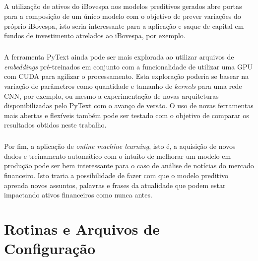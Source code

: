 \documentclass[grad,numbers]{coppe}
\begin{document}
 			\paragraph{}A utilização de ativos do iBovespa nos modelos preditivos gerados abre portas para a composição de um único modelo com o objetivo de prever variações do próprio iBovespa, isto seria interessante para a aplicação e saque de capital em fundos de investimento atrelados ao iBovespa, por exemplo.
 			\paragraph{}A ferramenta PyText ainda pode ser mais explorada ao utilizar arquivos de \textit{embeddings} pré-treinados em conjunto com a funcionalidade de utilizar uma GPU com CUDA para agilizar o processamento. Esta exploração poderia se basear na variação de parâmetros como quantidade e tamanho de \textit{kernels} para uma rede CNN, por exemplo, ou mesmo a experimentação de novas arquiteturas disponibilizadas pelo PyText com o avanço de versão. O uso de novas ferramentas mais abertas e flexíveis também pode ser testado com o objetivo de comparar os resultados obtidos neste trabalho.
 			\paragraph{}Por fim, a aplicação de \textit{online machine learning}, isto é, a aquisição de novos dados e treinamento automático com o intuito de melhorar um modelo em produção pode ser bem interessante para o caso de análise de notícias do mercado financeiro. Isto traria a possibilidade de fazer com que o modelo preditivo aprenda novos assuntos, palavras e frases da atualidade que podem estar impactando ativos financeiros como nunca antes.

  \backmatter
  
  

  \appendix	

	\chapter{Rotinas e Arquivos de Configuração}
\end{document}
